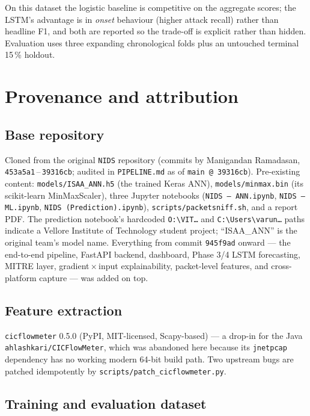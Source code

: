 \documentclass[11pt,a4paper]{article}
\begin{document}
On this dataset the logistic baseline is competitive on the aggregate scores;
the LSTM's advantage is in \emph{onset} behaviour (higher attack recall) rather
than headline F1, and both are reported so the trade-off is explicit rather
than hidden. Evaluation uses three expanding chronological folds plus an
untouched terminal 15\,\% holdout.

\section{Provenance and attribution}

\subsection*{Base repository}

Cloned from the original \texttt{NIDS} repository (commits by Manigandan
Ramadasan, \texttt{453a5a1}\,--\,\texttt{39316cb}; audited in
\texttt{PIPELINE.md} as of \texttt{main @ 39316cb}). Pre-existing content:
\texttt{models/ISAA\_ANN.h5} (the trained Keras ANN), \texttt{models/minmax.bin}
(its scikit-learn MinMaxScaler), three Jupyter notebooks
(\texttt{NIDS -- ANN.ipynb}, \texttt{NIDS -- ML.ipynb},
\texttt{NIDS (Prediction).ipynb}), \texttt{scripts/packetsniff.sh}, and a report
PDF. The prediction notebook's hardcoded \texttt{O:\textbackslash VIT\ldots} and
\texttt{C:\textbackslash Users\textbackslash varun\ldots} paths indicate a
Vellore Institute of Technology student project; ``ISAA\_ANN'' is the original
team's model name. Everything from commit \texttt{945f9ad} onward --- the
end-to-end pipeline, FastAPI backend, dashboard, Phase 3/4 LSTM forecasting,
MITRE layer, gradient\,$\times$\,input explainability, packet-level features, and
cross-platform capture --- was added on top.

\subsection*{Feature extraction}

\texttt{cicflowmeter} 0.5.0 (PyPI, MIT-licensed, Scapy-based) --- a drop-in for
the Java \texttt{ahlashkari/CICFlowMeter}, which was abandoned here because its
\texttt{jnetpcap} dependency has no working modern 64-bit build path. Two
upstream bugs are patched idempotently by \texttt{scripts/patch\_cicflowmeter.py}.

\subsection*{Training and evaluation dataset}
\end{document}
